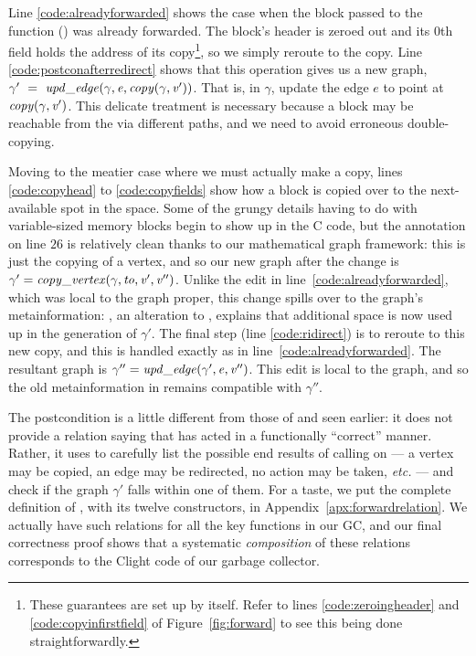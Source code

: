 Line \ref{code:alreadyforwarded} shows
the case when the block passed to the function () was already forwarded.
The block's header is zeroed out and its $0$th field holds
the address of its
copy\footnote{These guarantees are set up by  itself.
Refer to lines \ref{code:zeroingheader} and
\ref{code:copyinfirstfield} of Figure~\ref{fig:forward} to see this being done straightforwardly.},
so we simply reroute to the copy. 
Line \ref{code:postconafterredirect} shows that this operation
gives us a new graph, 
$\gamma'~=~\mathit{upd\_edge}(\gamma, \mathit{e}, \mathit{copy}(\gamma, \mathit{v'}))$.
That is, in $\gamma$, update the edge $e$ to point at
$\mathit{copy}(\gamma, \mathit{v'})$. 
This delicate treatment is necessary because
a block may be reachable from the  via different paths, 
and we need to avoid erroneous double-copying.

Moving to the meatier case where we must actually make a copy,
lines \ref{code:copyhead} to \ref{code:copyfields} show
how a block is copied over to the next-available spot in the
 space. Some of the grungy details having to do with
variable-sized memory blocks begin to show up in the C code,
but the annotation on line $26$ is relatively clean
thanks to our mathematical graph framework:
this is just the copying of a vertex, and so our new graph after the change is
$\gamma' = \mathit{copy\_vertex}(\gamma, \mathit{to}, \mathit{v'}, \mathit{v''})$.
Unlike the edit in line~\ref{code:alreadyforwarded}, which was
local to the graph proper, this
change spills over to the graph's metainformation: 
, an alteration to , explains that additional 
space is now used up in the  generation of $\gamma'$. 
The final step (line \ref{code:ridirect}) is to reroute to this
new copy, and this is handled exactly as in line~\ref{code:alreadyforwarded}. 
The resultant graph is $\gamma'' = \mathit{upd\_edge}(\gamma', \mathit{e}, \mathit{v''})$. 
This edit is local to the graph, and so the old metainformation in 
 remains compatible with $\gamma''$.

The postcondition is a little different from those of 
and  seen earlier: it does not provide a relation
saying that  has acted in a functionally ``correct'' manner. 
Rather, it uses  to carefully list the possible 
end results of calling
 on  --- a vertex may be copied, an edge may be redirected, 
no action may be taken, \emph{etc.} --- and check if the graph
$\gamma'$ falls within one of them.
For a taste, we put the complete definition
of , with its twelve constructors, 
in Appendix~\ref{apx:forwardrelation}. 
We actually have such relations for all the key functions in our GC, 
and our final correctness proof shows that a 
systematic \emph{composition} of these relations corresponds to the 
Clight code of our garbage collector. 


